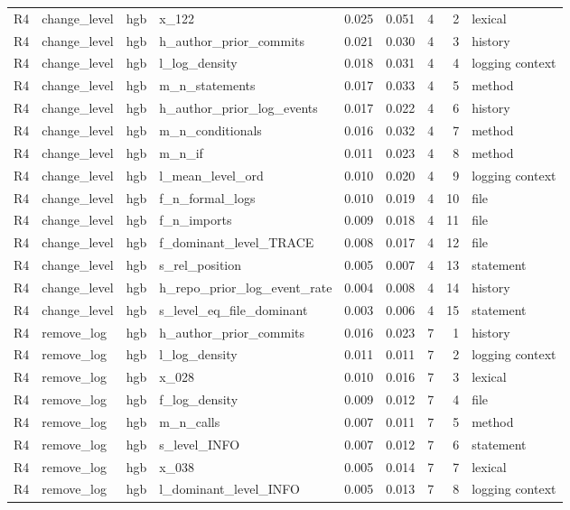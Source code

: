 {\begin{longtable}{llllrrrrl}
R4 & change\_level & hgb & x\_122 & 0.025 & 0.051 & 4 & 2 & lexical \\
R4 & change\_level & hgb & h\_author\_prior\_commits & 0.021 & 0.030 & 4 & 3 & history \\
R4 & change\_level & hgb & l\_log\_density & 0.018 & 0.031 & 4 & 4 & logging context \\
R4 & change\_level & hgb & m\_n\_statements & 0.017 & 0.033 & 4 & 5 & method \\
R4 & change\_level & hgb & h\_author\_prior\_log\_events & 0.017 & 0.022 & 4 & 6 & history \\
R4 & change\_level & hgb & m\_n\_conditionals & 0.016 & 0.032 & 4 & 7 & method \\
R4 & change\_level & hgb & m\_n\_if & 0.011 & 0.023 & 4 & 8 & method \\
R4 & change\_level & hgb & l\_mean\_level\_ord & 0.010 & 0.020 & 4 & 9 & logging context \\
R4 & change\_level & hgb & f\_n\_formal\_logs & 0.010 & 0.019 & 4 & 10 & file \\
R4 & change\_level & hgb & f\_n\_imports & 0.009 & 0.018 & 4 & 11 & file \\
R4 & change\_level & hgb & f\_dominant\_level\_TRACE & 0.008 & 0.017 & 4 & 12 & file \\
R4 & change\_level & hgb & s\_rel\_position & 0.005 & 0.007 & 4 & 13 & statement \\
R4 & change\_level & hgb & h\_repo\_prior\_log\_event\_rate & 0.004 & 0.008 & 4 & 14 & history \\
R4 & change\_level & hgb & s\_level\_eq\_file\_dominant & 0.003 & 0.006 & 4 & 15 & statement \\
R4 & remove\_log & hgb & h\_author\_prior\_commits & 0.016 & 0.023 & 7 & 1 & history \\
R4 & remove\_log & hgb & l\_log\_density & 0.011 & 0.011 & 7 & 2 & logging context \\
R4 & remove\_log & hgb & x\_028 & 0.010 & 0.016 & 7 & 3 & lexical \\
R4 & remove\_log & hgb & f\_log\_density & 0.009 & 0.012 & 7 & 4 & file \\
R4 & remove\_log & hgb & m\_n\_calls & 0.007 & 0.011 & 7 & 5 & method \\
R4 & remove\_log & hgb & s\_level\_INFO & 0.007 & 0.012 & 7 & 6 & statement \\
R4 & remove\_log & hgb & x\_038 & 0.005 & 0.014 & 7 & 7 & lexical \\
R4 & remove\_log & hgb & l\_dominant\_level\_INFO & 0.005 & 0.013 & 7 & 8 & logging context \\

\end{longtable}}
